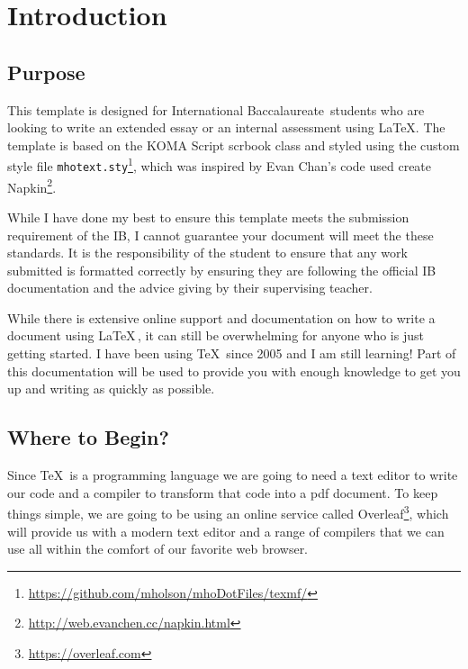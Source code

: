\chapter{Introduction}

\section{Purpose}

This template is designed for International Baccalaureate\texttrademark\, 
students who are looking to write an extended essay or an internal assessment 
using \LaTeX.  The template is based on the KOMA Script scrbook class and styled
using the custom style file 
\texttt{mhotext.sty}\footnote{\url{https://github.com/mholson/mhoDotFiles/texmf/}}, 
which was inspired by Evan Chan's code
used create Napkin\footnote{\url{http://web.evanchen.cc/napkin.html}}.

While I have done my best to ensure this template meets the submission
requirement of the IB, I cannot guarantee your document will meet the 
these standards.  It is the responsibility of the student to ensure that any 
work submitted is formatted correctly by ensuring they are following the 
official IB documentation and the advice giving by their supervising teacher.

While there is extensive online support and documentation on how to write
a document using \LaTeX\,, it can still be overwhelming for anyone who is just
getting started.  I have been using \TeX\, since 2005 and I am still
learning!  Part of this documentation will be used to provide you with
enough knowledge to get you up and writing as quickly as possible.


\section{Where to Begin?}

Since \TeX\, is a programming language we are going to need a text editor
to write our code and a compiler to transform that code into a pdf document.
To keep things simple, we are going to be using an online service called 
Overleaf\footnote{\url{https://overleaf.com}}, which will provide us with a 
modern text editor and a range of compilers that we can use all within the 
comfort of our favorite web browser.

